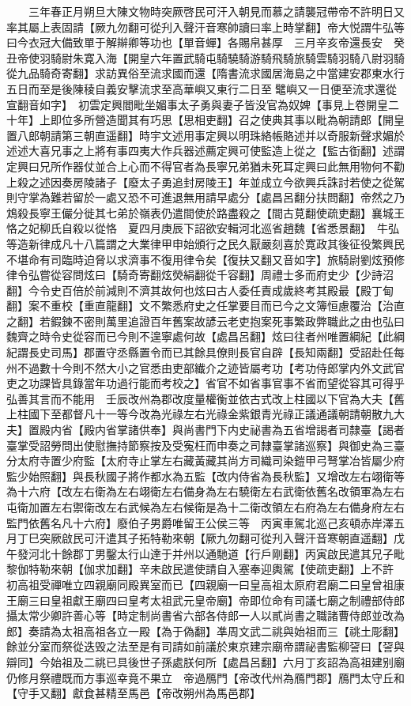 　　三年春正月朔旦大陳文物時突厥啓民可汗入朝見而慕之請襲冠帶帝不許明日又率其屬上表固請【厥九勿翻可從刋入聲汗音寒帥讀曰率上時掌翻】帝大悦謂牛弘等曰今衣冠大備致單于解辮卿等功也【單音蟬】各賜帛甚厚　三月辛亥帝還長安　癸丑帝使羽騎尉朱寛入海【開皇六年置武騎屯騎驍騎游騎飛騎旅騎雲騎羽騎八尉羽騎從九品騎奇寄翻】求訪異俗至流求國而還【隋書流求國居海島之中當建安郡東水行五日而至是後陳稜自義安擊流求至高華嶼又東行二日至鼊嶼又一日便至流求還從宣翻音如字】　初雲定興閻毗坐媚事太子勇與妻子皆没官為奴婢【事見上卷開皇二十年】上即位多所營造聞其有巧思【思相吏翻】召之使典其事以毗為朝請郎【開皇置八郎朝請第三朝直遥翻】時宇文述用事定興以明珠絡帳賂述并以奇服新聲求媚於述述大喜兄事之上將有事四夷大作兵器述薦定興可使監造上從之【監古衘翻】述謂定興曰兄所作器仗並合上心而不得官者為長寧兄弟猶未死耳定興曰此無用物何不勸上殺之述因奏房陵諸子【廢太子勇追封房陵王】年並成立今欲興兵誅討若使之從駕則守掌為難若留於一處又恐不可進退無用請早處分【處昌呂翻分扶問翻】帝然之乃鴆殺長寧王儼分徙其七弟於嶺表仍遣間使於路盡殺之【間古莧翻使疏吏翻】襄城王恪之妃柳氏自殺以從恪　夏四月庚辰下詔欲安輯河北巡省趙魏【省悉景翻】　牛弘等造新律成凡十八篇謂之大業律甲申始頒行之民久厭嚴刻喜於寛政其後征役繁興民不堪命有司臨時迫脅以求濟事不復用律令矣【復扶又翻又音如字】旅騎尉劉炫預修律令弘嘗從容問炫曰【騎奇寄翻炫熒絹翻從千容翻】周禮士多而府史少【少詩沼翻】今令史百倍於前減則不濟其故何也炫曰古人委任責成歲終考其殿最【殿丁甸翻】案不重校【重直龍翻】文不繁悉府史之任掌要目而已今之文簿恒慮覆治【治直之翻】若鍜鍊不密則萬里追證百年舊案故諺云老吏抱案死事繁政弊職此之由也弘曰魏齊之時令史從容而已今則不遑寧處何故【處昌呂翻】炫曰往者州唯置綱紀【此綱紀謂長史司馬】郡置守丞縣置令而已其餘具僚則長官自辟【長知兩翻】受詔赴任每州不過數十今則不然大小之官悉由吏部纎介之迹皆屬考功【考功侍郎掌内外文武官吏之功課皆具錄當年功過行能而考校之】省官不如省事官事不省而望從容其可得乎弘善其言而不能用　壬辰改州為郡改度量權衡並依古式改上柱國以下官為大夫【舊上柱國下至都督凡十一等今改為光祿左右光祿金紫銀青光祿正議通議朝請朝散九大夫】置殿内省【殿内省掌諸供奉】與尚書門下内史祕書為五省增謁者司隸臺【謁者臺掌受詔勞問出使慰撫持節察按及受寃枉而申奏之司隸臺掌諸巡察】與御史為三臺分太府寺置少府監【太府寺止掌左右藏黃藏其尚方司織司染鎧甲弓弩掌冶皆屬少府監少始照翻】與長秋國子將作都水為五監【改内侍省為長秋監】又增改左右翊衛等為十六府【改左右衛為左右翊衛左右備身為左右驍衛左右武衛依舊名改領軍為左右屯衛加置左右禦衛改左右武候為左右候衛是為十二衛改領左右府為左右備身府左右監門依舊名凡十六府】廢伯子男爵唯留王公侯三等　丙寅車駕北巡己亥頓赤岸澤五月丁巳突厥啟民可汗遣其子拓特勒來朝【厥九勿翻可從刋入聲汗音寒朝直遥翻】戊午發河北十餘郡丁男鑿太行山達于并州以通馳道【行戶剛翻】丙寅啟民遣其兄子毗黎伽特勒來朝【伽求加翻】辛未啟民遣使請自入塞奉迎輿駕【使疏吏翻】上不許　初高祖受禪唯立四親廟同殿異室而已【四親廟一曰皇高祖太原府君廟二曰皇曾祖康王廟三曰皇祖獻王廟四曰皇考太祖武元皇帝廟】帝即位命有司議七廟之制禮部侍郎攝太常少卿許善心等【時定制尚書省六部各侍郎一人以貳尚書之職諸曹侍郎並改為郎】奏請為太祖高祖各立一殿【為于偽翻】凖周文武二祧與始祖而三【祧土彫翻】餘並分室而祭從迭毁之法至是有司請如前議於東京建宗廟帝謂祕書監柳䛒曰【䛒與辯同】今始祖及二祧已具後世子孫處朕何所【處昌呂翻】六月丁亥詔為高祖建别廟仍修月祭禮既而方事巡幸竟不果立　帝過鴈門【帝改代州為鴈門郡】鴈門太守丘和【守手又翻】獻食甚精至馬邑【帝改朔州為馬邑郡】